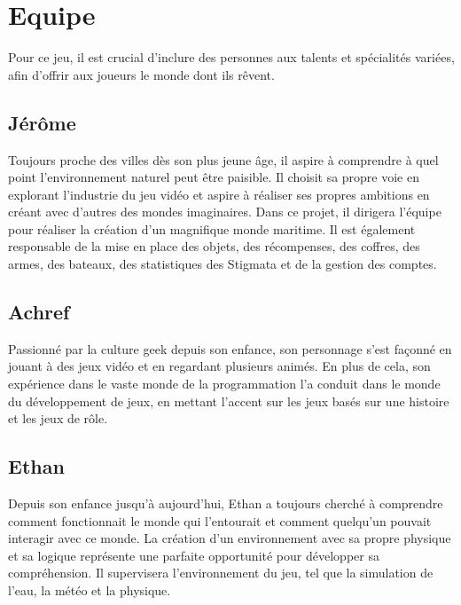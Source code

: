 \documentclass{article}
\begin{document}
\newpage
\section{Equipe}\hfill

Pour ce jeu, il est crucial d’inclure des personnes aux talents et spécialités variées, afin d’offrir aux joueurs le monde dont ils rêvent.

\subsection{Jérôme}\hfill

Toujours proche des villes dès son plus jeune âge, il aspire à comprendre à quel point l'environnement naturel peut être paisible. Il choisit sa propre voie en explorant l'industrie du jeu vidéo et aspire à réaliser ses propres ambitions en créant avec d'autres des mondes imaginaires. Dans ce projet, il dirigera l'équipe pour réaliser la création d'un magnifique monde maritime. Il est également responsable de la mise en place des objets, des récompenses, des coffres, des armes, des bateaux, des statistiques des Stigmata et de la gestion des comptes.





\subsection{Achref}\hfill

Passionné par la culture geek depuis son enfance, son personnage s'est façonné en jouant à des jeux vidéo et en regardant plusieurs animés. En plus de cela, son expérience dans le vaste monde de la programmation l'a conduit dans le monde du développement de jeux, en mettant l'accent sur les jeux basés sur une histoire et les jeux de rôle.





\subsection{Ethan}\hfill

Depuis son enfance jusqu’à aujourd’hui, Ethan a toujours cherché à comprendre comment fonctionnait le monde qui l’entourait et comment quelqu’un pouvait interagir avec ce monde. La création d'un environnement avec sa propre physique et sa logique représente une parfaite opportunité pour développer sa compréhension. Il supervisera l'environnement du jeu, tel que la simulation de l'eau, la météo et la physique.
\end{document}
